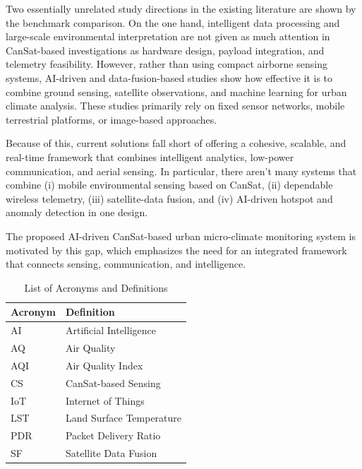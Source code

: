 \documentclass[conference]{IEEEtran}
\begin{document}
Two essentially unrelated study directions in the existing literature are shown by the benchmark comparison. On the one hand, intelligent data processing and large-scale environmental interpretation are not given as much attention in CanSat-based investigations as hardware design, payload integration, and telemetry feasibility. However, rather than using compact airborne sensing systems, AI-driven and data-fusion-based studies show how effective it is to combine ground sensing, satellite observations, and machine learning for urban climate analysis. These studies primarily rely on fixed sensor networks, mobile terrestrial platforms, or image-based approaches.

Because of this, current solutions fall short of offering a cohesive, scalable, and real-time framework that combines intelligent analytics, low-power communication, and aerial sensing. In particular, there aren't many systems that combine (i) mobile environmental sensing based on CanSat, (ii) dependable wireless telemetry, (iii) satellite-data fusion, and (iv) AI-driven hotspot and anomaly detection in one design.

The proposed AI-driven CanSat-based urban micro-climate monitoring system is motivated by this gap, which emphasizes the need for an integrated framework that connects sensing, communication, and intelligence.

\begin{table}[!t]
\centering
\footnotesize
\caption{List of Acronyms and Definitions}
\label{table:acronyms}
\renewcommand{\arraystretch}{1.2}

\begin{tabular}{|p{1.5cm}|p{5.5cm}|}
\hline
\textbf{Acronym} & \textbf{Definition} \\
\hline

AI  & Artificial Intelligence \\
AQ  & Air Quality \\
AQI & Air Quality Index \\
CS  & CanSat-based Sensing \\
IoT & Internet of Things \\
LST & Land Surface Temperature \\
PDR & Packet Delivery Ratio \\
SF  & Satellite Data Fusion \\

\hline
\end{tabular}
\end{table}
\end{document}
